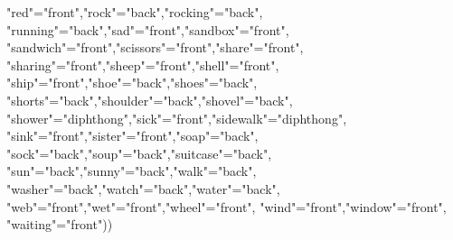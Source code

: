 \documentclass[
]{article}
\newenvironment{Shaded}{\begin{snugshade}}{\end{snugshade}}
\newcommand{\NormalTok}[1]{#1}
\newcommand{\OtherTok}[1]{\textcolor[rgb]{0.56,0.35,0.01}{#1}}
\newcommand{\StringTok}[1]{\textcolor[rgb]{0.31,0.60,0.02}{#1}}
\begin{document}
\begin{Shaded}
\begin{Highlighting}[]
                       \StringTok{"red"}\OtherTok{=}\StringTok{"front"}\NormalTok{,}\StringTok{"rock"}\OtherTok{=}\StringTok{"back"}\NormalTok{,}\StringTok{"rocking"}\OtherTok{=}\StringTok{"back"}\NormalTok{,}
                       \StringTok{"running"}\OtherTok{=}\StringTok{"back"}\NormalTok{,}\StringTok{"sad"}\OtherTok{=}\StringTok{"front"}\NormalTok{,}\StringTok{"sandbox"}\OtherTok{=}\StringTok{"front"}\NormalTok{,}
                       \StringTok{"sandwich"}\OtherTok{=}\StringTok{"front"}\NormalTok{,}\StringTok{"scissors"}\OtherTok{=}\StringTok{"front"}\NormalTok{,}\StringTok{"share"}\OtherTok{=}\StringTok{"front"}\NormalTok{,}
                       \StringTok{"sharing"}\OtherTok{=}\StringTok{"front"}\NormalTok{,}\StringTok{"sheep"}\OtherTok{=}\StringTok{"front"}\NormalTok{,}\StringTok{"shell"}\OtherTok{=}\StringTok{"front"}\NormalTok{,}
                       \StringTok{"ship"}\OtherTok{=}\StringTok{"front"}\NormalTok{,}\StringTok{"shoe"}\OtherTok{=}\StringTok{"back"}\NormalTok{,}\StringTok{"shoes"}\OtherTok{=}\StringTok{"back"}\NormalTok{,}
                       \StringTok{"shorts"}\OtherTok{=}\StringTok{"back"}\NormalTok{,}\StringTok{"shoulder"}\OtherTok{=}\StringTok{"back"}\NormalTok{,}\StringTok{"shovel"}\OtherTok{=}\StringTok{"back"}\NormalTok{,}
                             \StringTok{"shower"}\OtherTok{=}\StringTok{"diphthong"}\NormalTok{,}\StringTok{"sick"}\OtherTok{=}\StringTok{"front"}\NormalTok{,}\StringTok{"sidewalk"}\OtherTok{=}\StringTok{"diphthong"}\NormalTok{,}
                             \StringTok{"sink"}\OtherTok{=}\StringTok{"front"}\NormalTok{,}\StringTok{"sister"}\OtherTok{=}\StringTok{"front"}\NormalTok{,}\StringTok{"soap"}\OtherTok{=}\StringTok{"back"}\NormalTok{,}
                             \StringTok{"sock"}\OtherTok{=}\StringTok{"back"}\NormalTok{,}\StringTok{"soup"}\OtherTok{=}\StringTok{"back"}\NormalTok{,}\StringTok{"suitcase"}\OtherTok{=}\StringTok{"back"}\NormalTok{,}
                             \StringTok{"sun"}\OtherTok{=}\StringTok{"back"}\NormalTok{,}\StringTok{"sunny"}\OtherTok{=}\StringTok{"back"}\NormalTok{,}\StringTok{"walk"}\OtherTok{=}\StringTok{"back"}\NormalTok{,}
                             \StringTok{"washer"}\OtherTok{=}\StringTok{"back"}\NormalTok{,}\StringTok{"watch"}\OtherTok{=}\StringTok{"back"}\NormalTok{,}\StringTok{"water"}\OtherTok{=}\StringTok{"back"}\NormalTok{,}
                        \StringTok{"web"}\OtherTok{=}\StringTok{"front"}\NormalTok{,}\StringTok{"wet"}\OtherTok{=}\StringTok{"front"}\NormalTok{,}\StringTok{"wheel"}\OtherTok{=}\StringTok{"front"}\NormalTok{,}
                             \StringTok{"wind"}\OtherTok{=}\StringTok{"front"}\NormalTok{,}\StringTok{"window"}\OtherTok{=}\StringTok{"front"}\NormalTok{, }\StringTok{"waiting"}\OtherTok{=}\StringTok{"front"}\NormalTok{))}
\end{Highlighting}
\end{Shaded}
\end{document}

